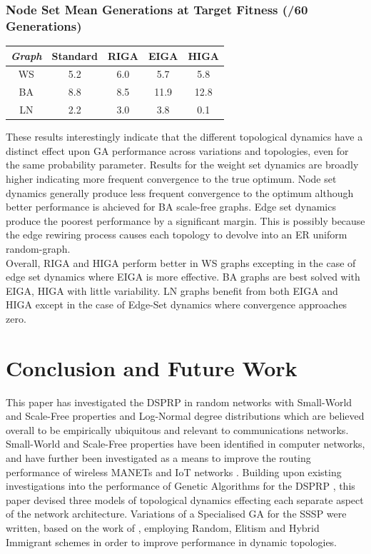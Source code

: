 \documentclass[
	a4paper, %
	10pt, %
	unnumberedsections, %
	twoside, %
]{LTJournalArticle}
\begin{document}
\subsubsection{Node Set Mean Generations at Target Fitness (/60 Generations)}

\begin{center}
\begin{tabular}{||c c c c c||} 
 \hline
 \emph{Graph} & Standard & RIGA & EIGA & HIGA \\ [0.5ex] 
 \hline\hline
 WS & 5.2 & 6.0 & 5.7 & 5.8 \\ 
 \hline
 BA & 8.8 & 8.5 & 11.9 & 12.8 \\
 \hline
 LN & 2.2 & 3.0 & 3.8 & 0.1 \\
\end{tabular}
\end{center}

These results interestingly indicate that the different topological dynamics have a distinct effect upon GA performance across variations and topologies, even for the same probability parameter. Results for the weight set dynamics are broadly higher indicating more frequent convergence to the true optimum. Node set dynamics generally produce less frequent convergence to the optimum although better performance is ahcieved for BA scale-free graphs. Edge set dynamics produce the poorest performance by a significant margin. This is possibly because the edge rewiring process causes each topology to devolve into an ER uniform random-graph. \\

Overall, RIGA and HIGA perform better in WS graphs excepting in the case of edge set dynamics where EIGA is more effective. BA graphs are best solved with EIGA, HIGA with little variability. LN graphs benefit from both EIGA and HIGA except in the case of Edge-Set dynamics where convergence approaches zero. 


\section{Conclusion and Future Work} 

This paper has investigated the DSPRP in random networks with Small-World and Scale-Free properties and Log-Normal degree distributions which are believed overall to be empirically ubiquitous and relevant to communications networks. Small-World and Scale-Free properties have been identified in computer networks, and have further been investigated as a means to improve the routing performance of wireless MANETs and IoT networks \cite{sohn:17} \cite{dong:15}. Building upon existing investigations into the performance of Genetic Algorithms for the DSPRP \cite{yang:10} \cite{kumar:10}, this paper devised three models of topological dynamics effecting each separate aspect of the network architecture. Variations of a Specialised GA for the SSSP were written, based on the work of \cite{yang:10}, employing Random, Elitism and Hybrid Immigrant schemes in order to improve performance in dynamic topologies. \\
\end{document}
